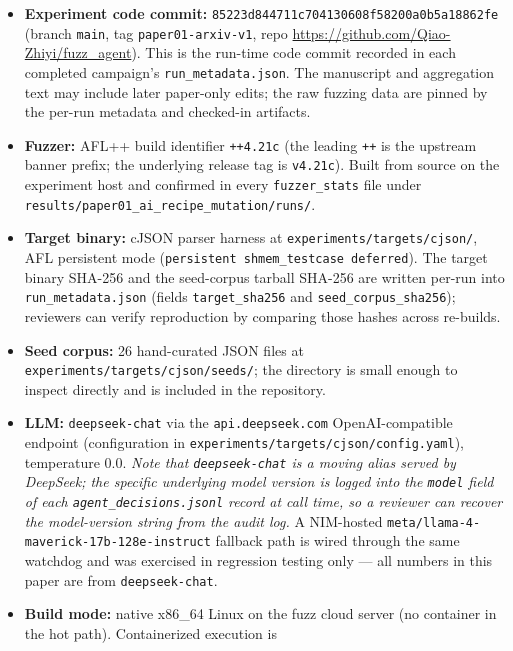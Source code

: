 \documentclass[11pt]{article}
\newcommand{\nimmodeid}{\texttt{meta/\allowbreak{}llama-4-\allowbreak{}maverick-\allowbreak{}17b-\allowbreak{}128e-\allowbreak{}instruct}}
\begin{document}
\begin{itemize}
  \setlength{\itemsep}{0.25em}
  \setlength{\parskip}{0pt}
  \item \textbf{Experiment code commit:}
  \texttt{85223d844711c704130608f58200a0b5a18862fe}
  (branch \texttt{main}, tag \texttt{paper01-arxiv-v1}, repo
  \url{https://github.com/Qiao-Zhiyi/fuzz_agent}). This is the
  run-time code commit recorded in each completed campaign's
  \texttt{run\_metadata.json}. The manuscript and aggregation text may
  include later paper-only edits; the raw fuzzing data are pinned by
  the per-run metadata and checked-in artifacts.
  \item \textbf{Fuzzer:} AFL++ build identifier \texttt{++4.21c}
  (the leading \texttt{++} is the upstream banner prefix; the
  underlying release tag is \texttt{v4.21c}). Built from source
  on the experiment host and confirmed in every
  \texttt{fuzzer\_stats} file under
  \texttt{results/paper01\_ai\_recipe\_mutation/runs/}.
  \item \textbf{Target binary:} cJSON parser harness at
  \texttt{experiments/targets/cjson/}, AFL persistent mode
  (\texttt{persistent shmem\_testcase deferred}). The target
  binary SHA-256 and the seed-corpus tarball SHA-256 are written
  per-run into \texttt{run\_metadata.json}
  (fields \texttt{target\_sha256} and \texttt{seed\_corpus\_sha256});
  reviewers can verify reproduction by comparing those hashes
  across re-builds.
  \item \textbf{Seed corpus:} 26 hand-curated JSON files at
  \texttt{experiments/targets/cjson/seeds/}; the directory is
  small enough to inspect directly and is included in the
  repository.
  \item \textbf{LLM:} \texttt{deepseek-chat} via the
  \texttt{api.deepseek.com} OpenAI-compatible endpoint
  (configuration in
  \texttt{experiments/targets/cjson/config.yaml}),
  temperature $0.0$. \emph{Note that
  \texttt{deepseek-chat} is a moving alias served by DeepSeek;
  the specific underlying model version is logged into the
  \texttt{model} field of each \texttt{agent\_decisions.jsonl}
  record at call time, so a reviewer can recover the
  model-version string from the audit log.} A NIM-hosted
  \nimmodeid{}
  fallback path is wired through the same watchdog and was
  exercised in regression testing only --- all numbers in this
  paper are from \texttt{deepseek-chat}.
  \item \textbf{Build mode:} native x86\_64 Linux on the fuzz cloud
  server (no container in the hot path). Containerized execution is

\end{itemize}
\end{document}
